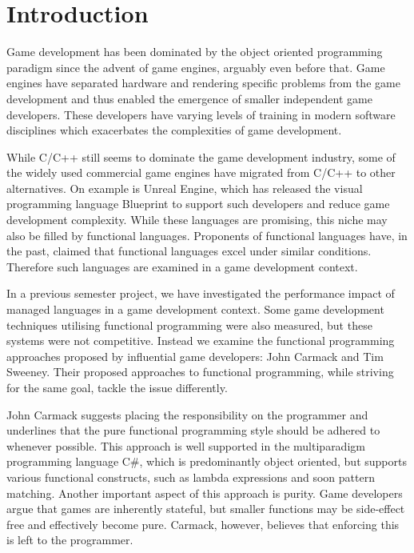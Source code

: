 \chapter{Introduction} \label{chap:introduction}
Game development has been dominated by the object oriented programming paradigm since the advent of game engines\cite{anderson2011:scripting-classes}, arguably even before that. Game engines have separated hardware and rendering specific problems from the game development and thus enabled the emergence of smaller independent game developers\cite{michael2003indie}. These developers have varying levels of training in modern software disciplines\cite{mcgill2009defining, hewner2010game} which exacerbates the complexities of game development\cite{blow2004game}.

While C/C++ still seems to dominate the game development industry\cite{wikipedia:list:of:game:engines}, some of the widely used commercial game engines have migrated from C/C++ to other alternatives. On example is Unreal Engine, which has released the visual programming language Blueprint\cite{unreal:blueprint:intro} to support such developers and reduce game development complexity\cite{unreal:blueprint:overview}. While these languages are promising, this niche may also be filled by functional languages. Proponents of functional languages have, in the past, claimed that functional languages excel under similar conditions\cite{kemerer2009impact, hughes1989functional, hu2015functional}. Therefore such languages are examined in a game development context.

In a previous semester project, we have investigated the performance impact of managed languages in a game development context\cite{p92018gameplay}. Some game development techniques utilising functional programming were also measured, but these systems were not competitive. Instead we examine the functional programming approaches proposed by influential game developers: John Carmack and Tim Sweeney. Their proposed approaches to functional programming, while striving for the same goal, tackle the issue differently.


John Carmack suggests placing the responsibility on the programmer and underlines that the pure functional programming style should be adhered to whenever possible\cite{gamasutra:c++functional}. This approach is well supported in the multiparadigm programming language C\#, which is predominantly object oriented, but supports various functional constructs, such as lambda expressions\cite{csharp:lambda} and soon pattern matching\cite{csharp:pattern:matching}. Another important aspect of this approach is purity. Game developers argue that games are inherently stateful\cite{games:stateful}, but smaller functions may be side-effect free and effectively become pure. Carmack, however, believes that enforcing this is left to the programmer.

